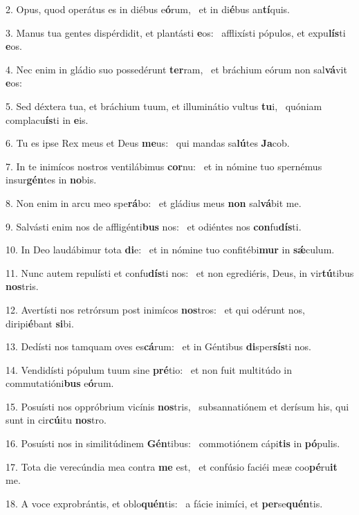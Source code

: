 2. Opus, quod operátus es in diébus e\textbf{ó}rum, \ast\  et in di\textbf{é}bus an\textbf{tí}quis.\

3. Manus tua gentes dispérdidit, et plantásti \textbf{e}os: \ast\  afflixísti pópulos, et expu\textbf{lís}ti \textbf{e}os.\

4. Nec enim in gládio suo possedérunt \textbf{ter}ram, \ast\  et bráchium eórum non sal\textbf{vá}vit \textbf{e}os:\

5. Sed déxtera tua, et bráchium tuum, et illuminátio vultus \textbf{tu}i, \ast\  quóniam complacu\textbf{ís}ti in \textbf{e}is.\

6. Tu es ipse Rex meus et Deus \textbf{me}us: \ast\  qui mandas sa\textbf{lú}tes \textbf{Ja}cob.\

7. In te inimícos nostros ventilábimus \textbf{cor}nu: \ast\  et in nómine tuo spernémus insur\textbf{gén}tes in \textbf{no}bis.\

8. Non enim in arcu meo spe\textbf{rá}bo: \ast\  et gládius meus \textbf{non} sal\textbf{vá}bit me.\

9. Salvásti enim nos de affligénti\textbf{bus} nos: \ast\  et odiéntes nos \textbf{con}fu\textbf{dís}ti.\

10. In Deo laudábimur tota \textbf{di}e: \ast\  et in nómine tuo confitébi\textbf{mur} in \textbf{sǽ}culum.\

11. Nunc autem repulísti et confu\textbf{dís}ti nos: \ast\  et non egrediéris, Deus, in vir\textbf{tú}tibus \textbf{nos}tris.\

12. Avertísti nos retrórsum post inimícos \textbf{nos}tros: \ast\  et qui odérunt nos, diripi\textbf{é}bant \textbf{si}bi.\

13. Dedísti nos tamquam oves es\textbf{cá}rum: \ast\  et in Géntibus \textbf{di}sper\textbf{sís}ti nos.\

14. Vendidísti pópulum tuum sine \textbf{pré}tio: \ast\  et non fuit multitúdo in commutatióni\textbf{bus} e\textbf{ó}rum.\

15. Posuísti nos oppróbrium vicínis \textbf{nos}tris, \ast\  subsannatiónem et derísum his, qui sunt in cir\textbf{cú}itu \textbf{nos}tro.\

16. Posuísti nos in similitúdinem \textbf{Gén}tibus: \ast\  commotiónem cápi\textbf{tis} in \textbf{pó}pulis.\

17. Tota die verecúndia mea contra \textbf{me} est, \ast\  et confúsio faciéi meæ coo\textbf{pé}ru\textbf{it} me.\

18. A voce exprobrántis, et oblo\textbf{quén}tis: \ast\  a fácie inimíci, et \textbf{per}se\textbf{quén}tis.\

